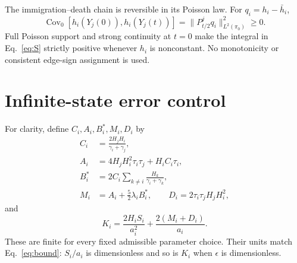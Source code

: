 \documentclass[aps,pre,twocolumn,showpacs,amsmath,amssymb]{revtex4-2}
\begin{document}
The immigration--death chain is reversible in its Poisson law. For $q_i=h_i-\bar h_i$,
\begin{equation}
\operatorname{Cov}_0[h_i(Y_j(0)),h_i(Y_j(t))]
=\|P_{t/2}^jq_i\|_{L^2(\pi_0)}^2\geq0.\label{eq:positive}
\end{equation}
Full Poisson support and strong continuity at $t=0$ make the integral in Eq.~\eqref{eq:S} strictly positive whenever $h_i$ is nonconstant. No monotonicity or consistent edge-sign assignment is used.

\section{Infinite-state error control}
For clarity, define $C_i,A_i,B_i^*,M_i,D_i$ by
\begin{align}
C_i&=\frac{2H_jH_i}{\gamma_i+\gamma_j},\nonumber\\
A_i&=4H_jH_i^2\tau_i\tau_j+H_iC_i\tau_i,\nonumber\\
B_i^*&=2C_i\sum_{k\ne i}\frac{H_k}{\gamma_i+\gamma_k},\nonumber\\
M_i&=A_i+\frac52\lambda_iB_i^*,\qquad
D_i=2\tau_i\tau_jH_jH_i^2,
\label{eq:constants}
\end{align}
and
\begin{equation}
K_i=\frac{2H_iS_i}{a_i^2}+\frac{2(M_i+D_i)}{a_i}.\label{eq:K}
\end{equation}
These are finite for every fixed admissible parameter choice. Their units match Eq.~\eqref{eq:bound}: $S_i/a_i$ is dimensionless and so is $K_i$ when $\epsilon$ is dimensionless.
\end{document}
